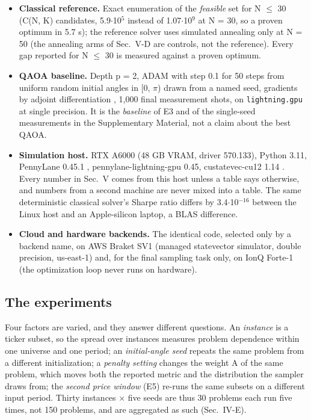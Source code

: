 \documentclass{ieeeaccess}
\begin{document}
\begin{itemize}
\item \textbf{Classical reference.} Exact enumeration of the \textit{feasible} set for N $\leq$ 30 (C(N, K) candidates, 5.9$\cdot$10$^{5}$ instead of 1.07$\cdot$10$^{9}$ at N = 30, so a proven optimum in 5.7 s); the reference solver uses simulated annealing \cite{ref44} only at N = 50 (the annealing arms of Sec.~V-D are controls, not the reference). Every gap reported for N $\leq$ 30 is measured against a proven optimum.
\item \textbf{QAOA baseline.} Depth p = 2, ADAM \cite{ref45} with step 0.1 for 50 steps from uniform random initial angles in [0, $\pi$) drawn from a named seed, gradients by adjoint differentiation \cite{ref40}, 1,000 final measurement shots, on \texttt{lightning.gpu} at single precision. It is the \textit{baseline} of E3 and of the single-seed measurements in the Supplementary Material, not a claim about the best QAOA.
\item \textbf{Simulation host.} RTX A6000 (48 GB VRAM, driver 570.133), Python 3.11, PennyLane 0.45.1 \cite{ref38}, pennylane-lightning-gpu 0.45, custatevec-cu12 1.14 \cite{ref39}. Every number in Sec.~V comes from this host unless a table says otherwise, and numbers from a second machine are never mixed into a table. The same deterministic classical solver's Sharpe ratio differs by 3.4$\cdot$10$^{-16}$ between the Linux host and an Apple-silicon laptop, a BLAS difference.
\item \textbf{Cloud and hardware backends.} The identical code, selected only by a backend name, on AWS Braket SV1 (managed statevector simulator, double precision, us-east-1) and, for the final sampling task only, on IonQ Forte-1 (the optimization loop never runs on hardware).
\end{itemize}


\subsection{The experiments}


Four factors are varied, and they answer different questions. An \textit{instance} is a ticker subset, so the spread over instances measures problem dependence within one universe and one period; an \textit{initial-angle seed} repeats the same problem from a different initialization; a \textit{penalty setting} changes the weight A of the same problem, which moves both the reported metric and the distribution the sampler draws from; the \textit{second price window} (E5) re-runs the same subsets on a different input period. Thirty instances $\times$ five seeds are thus 30 problems each run five times, not 150 problems, and are aggregated as such (Sec.~IV-E).
\end{document}
